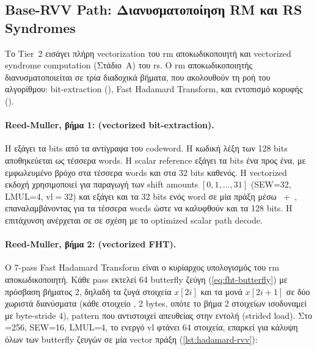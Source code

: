 \subsection{Base-RVV Path: Διανυσματοποίηση RM και RS Syndromes}
\label{sec:decode-rvv}

Το Tier~2 εισάγει πλήρη \RVV vectorization του \gls{rm} αποκωδικοποιητή και
vectorized syndrome computation (Στάδιο~A) του \gls{rs}.
Ο \gls{rm} αποκωδικοποιητής διανυσματοποιείται σε τρία διαδοχικά βήματα, που
ακολουθούν τη ροή του αλγορίθμου: bit-extraction (),
Fast Hadamard Transform, και εντοπισμό κορυφής ().

\paragraph{Reed-Muller, βήμα 1:  (vectorized bit-extraction).}
Η  εξάγει τα bits από τα  αντίγραφα
του codeword. Η κωδική λέξη των \num{128} bits αποθηκεύεται ως τέσσερα  words. 
Η scalar reference εξάγει τα bits ένα προς ένα, με εμφωλευμένο βρόχο στα τέσσερα words 
και στα \num{32} bits καθενός. Η vectorized
εκδοχή χρησιμοποιεί  για παραγωγή των shift amounts
$[0, 1, \ldots, 31]$ (SEW=32, LMUL=4, $\text{vl}=32$) και εξάγει και τα
\num{32} bits ενός  word σε μία πράξη μέσω
~+~, επαναλαμβάνοντας για τα τέσσερα words ώστε 
να καλυφθούν και τα \num{128} bits.
Η επιτάχυνση ανέρχεται σε  σε σχέση με το optimized scalar path decode.

\paragraph{Reed-Muller, βήμα 2:  (vectorized FHT).}
Ο 7-pass Fast Hadamard Transform είναι ο κυρίαρχος υπολογισμός του \gls{rm}
αποκωδικοποιητή. Κάθε pass εκτελεί \num{64} butterfly ζεύγη (\cref{eq:fht-butterfly}) 
με πρόσβαση βήματος 2, δηλαδή τα ζυγά στοιχεία $x[2i]$ και τα μονά $x[2i+1]$ σε δύο 
χωριστά διανύσματα (κάθε στοιχείο , \num{2} bytes, οπότε το βήμα 
2 στοιχείων ισοδυναμεί με byte-stride \num{4}),
pattern που αντιστοιχεί απευθείας στην εντολή  (strided load). Στο
\VLEN{}=\num{256}, SEW=16, LMUL=4, το ενεργό $\text{vl}$ φτάνει \num{64}
στοιχεία, επαρκεί για κάλυψη όλων των butterfly ζευγών σε μία vector πράξη
(\cref{lst:hadamard-rvv}):

